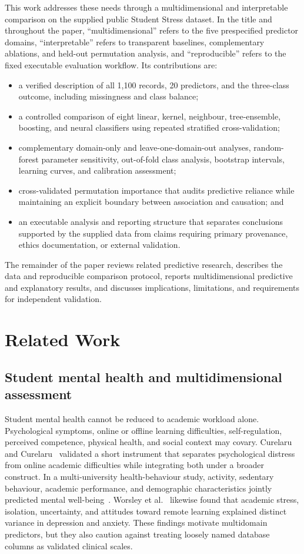\documentclass[review]{elsarticle}
\begin{document}
This work addresses these needs through a multidimensional and interpretable comparison on the supplied public Student Stress dataset. In the title and throughout the paper, ``multidimensional'' refers to the five prespecified predictor domains, ``interpretable'' refers to transparent baselines, complementary ablations, and held-out permutation analysis, and ``reproducible'' refers to the fixed executable evaluation workflow. Its contributions are:
\begin{itemize}
  \item a verified description of all 1,100 records, 20 predictors, and the three-class outcome, including missingness and class balance;
  \item a controlled comparison of eight linear, kernel, neighbour, tree-ensemble, boosting, and neural classifiers using repeated stratified cross-validation;
  \item complementary domain-only and leave-one-domain-out analyses, random-forest parameter sensitivity, out-of-fold class analysis, bootstrap intervals, learning curves, and calibration assessment;
  \item cross-validated permutation importance that audits predictive reliance while maintaining an explicit boundary between association and causation; and
  \item an executable analysis and reporting structure that separates conclusions supported by the supplied data from claims requiring primary provenance, ethics documentation, or external validation.
\end{itemize}

The remainder of the paper reviews related predictive research, describes the data and reproducible comparison protocol, reports multidimensional predictive and explanatory results, and discusses implications, limitations, and requirements for independent validation.

\section{Related Work}\label{sec:related}
\subsection{Student mental health and multidimensional assessment}
Student mental health cannot be reduced to academic workload alone. Psychological symptoms, online or offline learning difficulties, self-regulation, perceived competence, physical health, and social context may covary. Curelaru and Curelaru~\cite{curelaru2025} validated a short instrument that separates psychological distress from online academic difficulties while integrating both under a broader construct. In a multi-university health-behaviour study, activity, sedentary behaviour, academic performance, and demographic characteristics jointly predicted mental well-being~\cite{rahman2023}. Worsley et al.~\cite{worsley2024} likewise found that academic stress, isolation, uncertainty, and attitudes toward remote learning explained distinct variance in depression and anxiety. These findings motivate multidomain predictors, but they also caution against treating loosely named database columns as validated clinical scales.
\end{document}

